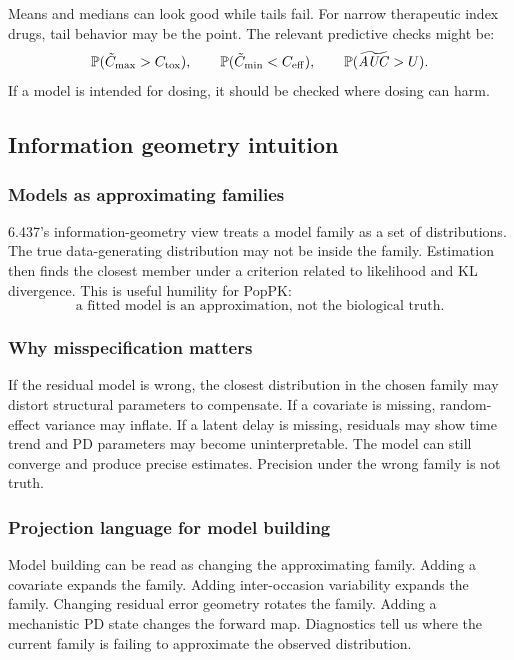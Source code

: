 Means and medians can look good while tails fail.  For narrow therapeutic index drugs, tail behavior may be the point.  The relevant predictive checks might be:
\[
  \Prob(\tilde C_{\max}>C_{\mathrm{tox}}),
  \qquad
  \Prob(\tilde C_{\min}<C_{\mathrm{eff}}),
  \qquad
  \Prob(\widetilde{\pksym{AUC}}>U).
\]
If a model is intended for dosing, it should be checked where dosing can harm.

\subsection{Information geometry intuition}

\subsubsection*{Models as approximating families}

6.437's information-geometry view treats a model family as a set of distributions.  The true data-generating distribution may not be inside the family.  Estimation then finds the closest member under a criterion related to likelihood and KL divergence.  This is useful humility for PopPK:
\[
  \text{a fitted model is an approximation, not the biological truth.}
\]

\subsubsection*{Why misspecification matters}

If the residual model is wrong, the closest distribution in the chosen family may distort structural parameters to compensate.  If a covariate is missing, random-effect variance may inflate.  If a latent delay is missing, residuals may show time trend and PD parameters may become uninterpretable.  The model can still converge and produce precise estimates.  Precision under the wrong family is not truth.

\subsubsection*{Projection language for model building}

Model building can be read as changing the approximating family.  Adding a covariate expands the family.  Adding inter-occasion variability expands the family.  Changing residual error geometry rotates the family.  Adding a mechanistic PD state changes the forward map.  Diagnostics tell us where the current family is failing to approximate the observed distribution.

